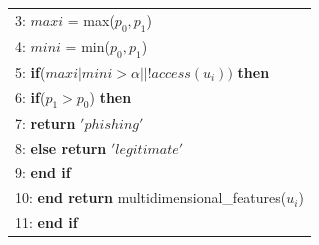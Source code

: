 \documentclass{ieeeaccess}
\begin{document}
\begin{table}[htp]
\begin{tabular}{l}
                            \\
3: $maxi$ = max($p_{0},p_{1}$)                                                                                                                                                                                                                \\
4: $mini$ = min($p_{0},p_{1}$)                                                                                                                                                                                                                                              \\
5: \textbf{if}($maxi|mini > \alpha ||!access(u_{i}))$ \textbf{then}                                                                                                                                                                                                                                                              \\
6: \hspace{4pt} \textbf{if}($p_{1} > p_{0}$) \textbf{then}                                                                                                                                                                                                                                                              \\
7: \hspace{8pt} \textbf{return} $'phishing'$                                                                                                                                                                                                                                              \\
8: \hspace{4pt} \textbf{else return} $'legitimate'$                                                                                                                                                                                        \\
9: \textbf{end if}                                                                                                                                                                                                                                         \\
10: \textbf{end return} multidimensional\_features($u_{i}$)  
                                       \\

11: \textbf{end if}

\\ \hline

\end{tabular}
\end{table}
\end{document}
